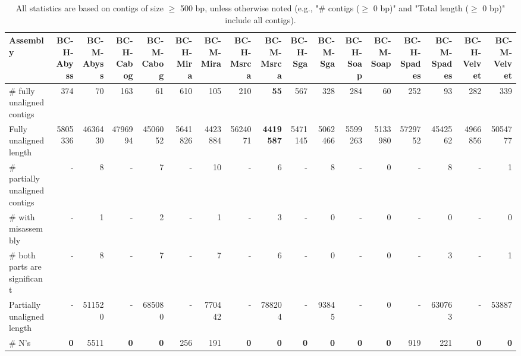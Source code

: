 \documentclass[12pt,a4paper]{article}
\begin{document}
\begin{table}[ht]
\begin{center}
\caption{All statistics are based on contigs of size $\geq$ 500 bp, unless otherwise noted (e.g., "\# contigs ($\geq$ 0 bp)" and "Total length ($\geq$ 0 bp)" include all contigs).}
\begin{tabular}{|l*{16}{|r}|}
\hline
Assembly & BC-H-Abyss & BC-M-Abyss & BC-H-Cabog & BC-M-Cabog & BC-H-Mira & BC-M-Mira & BC-H-Msrca & BC-M-Msrca & BC-H-Sga & BC-M-Sga & BC-H-Soap & BC-M-Soap & BC-H-Spades & BC-M-Spades & BC-H-Velvet & BC-M-Velvet \\ \hline
\# fully unaligned contigs & 374 & 70 & 163 & 61 & 610 & 105 & 210 & {\bf 55} & 567 & 328 & 284 & 60 & 252 & 93 & 282 & 339 \\ \hline
Fully unaligned length & 5805336 & 4636430 & 4796994 & 4506052 & 5641826 & 4423884 & 5624071 & {\bf 4419587} & 5471145 & 5062466 & 5599263 & 5133980 & 5729752 & 4542562 & 4966856 & 5054777 \\ \hline
\# partially unaligned contigs & - & 8 & - & 7 & - & 10 & - & 6 & - & 8 & - & 0 & - & 8 & - & 1 \\ \hline
\hspace{5mm}\# with misassembly & - & 1 & - & 2 & - & 1 & - & 3 & - & 0 & - & 0 & - & 0 & - & 0 \\ \hline
\hspace{5mm}\# both parts are significant & - & 8 & - & 7 & - & 7 & - & 6 & - & 0 & - & 0 & - & 3 & - & 1 \\ \hline
Partially unaligned length & - & 511520 & - & 685080 & - & 770442 & - & 788204 & - & 93845 & - & 0 & - & 630763 & - & 53887 \\ \hline
\# N's & {\bf 0} & 5511 & {\bf 0} & {\bf 0} & 256 & 191 & {\bf 0} & {\bf 0} & {\bf 0} & {\bf 0} & {\bf 0} & {\bf 0} & 919 & 221 & {\bf 0} & {\bf 0} \\ \hline
\end{tabular}
\end{center}
\end{table}
\end{document}
